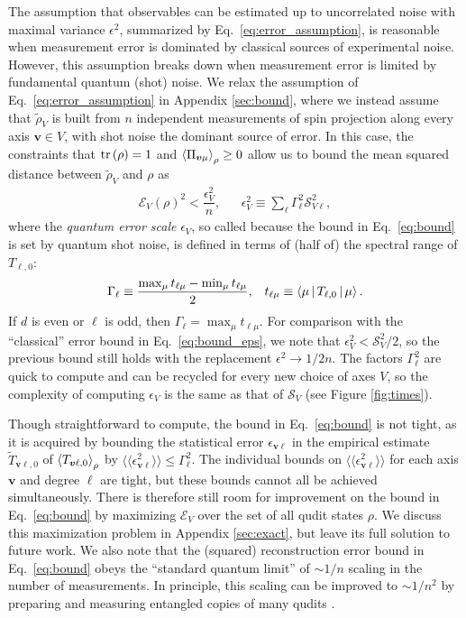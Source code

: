\documentclass[a4paper,twocolumn,unpublished]{quantumarticle}
\newcommand{\f}[2]{\dfrac{#1}{#2}} %
\newcommand{\p}[1]{\left(#1\right)} %
\newcommand{\bk}{\Braket} %
\newcommand{\bbk}[1]{\langle\!\langle #1 \rangle\!\rangle}
\newcommand{\E}{\mathcal{E}}
\renewcommand{\S}{\mathcal{S}}
\begin{document}
The assumption that observables can be estimated up to uncorrelated noise with maximal variance $\epsilon^2$, summarized by Eq.~\eqref{eq:error_assumption}, is reasonable when measurement error is dominated by classical sources of experimental noise.
However, this assumption breaks down when measurement error is limited by fundamental quantum (shot) noise.
We relax the assumption of Eq.~\eqref{eq:error_assumption} in Appendix \ref{sec:bound}, where we instead assume that $\tilde\rho_V$ is built from $n$ independent measurements of spin projection along every axis $\bm v\in V$, with shot noise the dominant source of error.
In this case, the constraints that $\tr\p\rho=1$ and $\bk{\Pi_{\bm v\mu}}_\rho\ge0$ allow us to bound the mean squared distance between $\tilde\rho_V$ and $\rho$ as
\begin{align}
  \E_V\p{\rho}^2 < \f{\epsilon_V^2}{n},
  &&
  \epsilon_V^2 \equiv \sum_\ell \Gamma_\ell^2 \S_{V\ell}^2,
  \label{eq:bound}
\end{align}
where the {\it quantum error scale} $\epsilon_V$, so called because the bound in Eq.~\eqref{eq:bound} is set by quantum shot noise, is defined in terms of (half of) the spectral range of $T_{\ell,0}$:
\begin{align}
  \Gamma_\ell \equiv \f{\max_\mu t_{\ell\mu} - \min_\mu t_{\ell\mu}}{2},
  &&
  t_{\ell\mu} \equiv \bk{\mu|T_{\ell,0}|\mu}.
\end{align}
If $d$ is even or $\ell$ is odd, then $\Gamma_\ell=\max_\mu t_{\ell\mu}$.
For comparison with the ``classical'' error bound in Eq.~\eqref{eq:bound_eps}, we note that $\epsilon_V^2<\S_V^2/2$, so the previous bound still holds with the replacement $\epsilon^2\to1/2n$.
The factors $\Gamma_\ell^2$ are quick to compute and can be recycled for every new choice of axes $V$, so the complexity of computing $\epsilon_V$ is the same as that of $\S_V$ (see Figure \ref{fig:times}).

Though straightforward to compute, the bound in Eq.~\eqref{eq:bound} is not tight, as it is acquired by bounding the statistical error $\epsilon_{\bm v\ell}$ in the empirical estimate $\tilde T_{\bm v\ell,0}$ of $\bk{T_{\bm v\ell,0}}_\rho$ by $\bbk{\epsilon_{\bm v\ell}^2}\le\Gamma_\ell^2$.
The individual bounds on $\bbk{\epsilon_{\bm v\ell}^2}$ for each axis $\bm v$ and degree $\ell$ are tight, but these bounds cannot all be achieved simultaneously.
There is therefore still room for improvement on the bound in Eq.~\eqref{eq:bound} by maximizing $\E_V$ over the set of all qudit states $\rho$.
We discuss this maximization problem in Appendix \ref{sec:exact}, but leave its full solution to future work.
We also note that the (squared) reconstruction error bound in Eq.~\eqref{eq:bound} obeys the ``standard quantum limit'' of $\sim1/n$ scaling in the number of measurements.
In principle, this scaling can be improved to $\sim1/n^2$ by preparing and measuring entangled copies of many qudits \cite{giovannetti2006quantum}.
\end{document}
